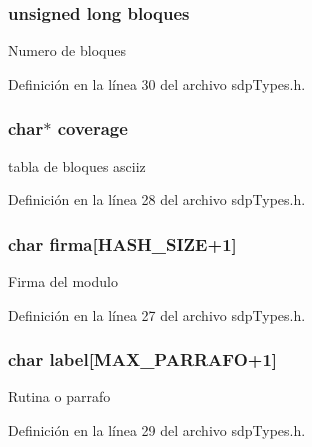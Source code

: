 \subsubsection[{bloques}]{\setlength{\rightskip}{0pt plus 5cm}unsigned long bloques}\label{struct_s_t___s_d_p_a2524760e620af27370f7dbf1a45750a5}
Numero de bloques 

Definición en la línea 30 del archivo sdp\+Types.\+h.

\hypertarget{struct_s_t___s_d_p_a88033942c6a9207d32af22c3f69cc31e}{}
\subsubsection[{coverage}]{\setlength{\rightskip}{0pt plus 5cm}char$\ast$ coverage}\label{struct_s_t___s_d_p_a88033942c6a9207d32af22c3f69cc31e}
tabla de bloques asciiz 

Definición en la línea 28 del archivo sdp\+Types.\+h.

\hypertarget{struct_s_t___s_d_p_a11de7bbb4add4ed0cf596ea7a05cb841}{}
\subsubsection[{firma}]{\setlength{\rightskip}{0pt plus 5cm}char firma\mbox{[}{\bf H\+A\+S\+H\+\_\+\+S\+I\+Z\+E}+1\mbox{]}}\label{struct_s_t___s_d_p_a11de7bbb4add4ed0cf596ea7a05cb841}
Firma del modulo 

Definición en la línea 27 del archivo sdp\+Types.\+h.

\hypertarget{struct_s_t___s_d_p_aa62a205ca9e35b3b88632d2ec557a5a0}{}
\subsubsection[{label}]{\setlength{\rightskip}{0pt plus 5cm}char label\mbox{[}{\bf M\+A\+X\+\_\+\+P\+A\+R\+R\+A\+F\+O}+1\mbox{]}}\label{struct_s_t___s_d_p_aa62a205ca9e35b3b88632d2ec557a5a0}
Rutina o parrafo 

Definición en la línea 29 del archivo sdp\+Types.\+h.

\hypertarget{struct_s_t___s_d_p_a59b9df3193b6f874922b75715fc1bc81}{}
